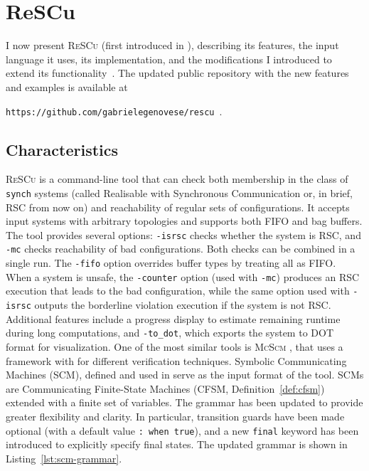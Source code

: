 \chapter{ReSCu}\label{sec:rescu}
I now present \textsc{ReSCu} (first introduced in \cite{desgeorges2023rsc, di2023multiparty, guizouarn2023communicating}),
describing its features, the input
language it uses, its implementation, and the modifications I introduced to
extend its functionality~\cite{rescuoriginalrepo}. The updated
public repository with 
the new features and examples is available at 
\begin{center}
\verb|https://github.com/gabrielegenovese/rescu|~\cite{rescurepo}.
\end{center}

\section{Characteristics}
\textsc{ReSCu} is a command-line tool that can check both membership in the 
class of \verb|synch| systems (called Realisable with Synchronous Communication 
or, in brief, RSC from now on) and reachability of regular sets of configurations. It 
accepts input systems with arbitrary topologies and supports both FIFO and 
bag buffers. The tool provides several options: 
\verb|-isrsc| checks whether the system is RSC, and \verb|-mc| checks reachability of 
bad configurations. Both checks can be combined in a single run. The \verb|-fifo| option 
overrides buffer types by treating all as FIFO. When a system is unsafe, the 
\verb|-counter| option (used with \verb|-mc|) produces an RSC execution that leads 
to the bad configuration, while the same option used with \verb|-isrsc| outputs the 
borderline violation execution if the system is not RSC. Additional features include 
a progress display to estimate remaining runtime during long computations, and 
\verb|-to_dot|, which exports the system to DOT format for visualization.
One of the most similar tools is \textsc{McScm} \cite{heussner2012mcscm}, that
uses a framework with for different verification techniques. 
Symbolic Communicating Machines (SCM), defined and used in \cite[Definition 5.1]{le2008abstract}
serve as the input format of the tool. SCMs are Communicating 
Finite-State Machines (CFSM, Definition~\ref{def:cfsm}) 
extended with a finite set of variables.
The grammar has been updated to provide greater flexibility and clarity. In
particular, transition guards have been made optional (with a default value
\verb|: when true|), and a new \verb|final| keyword has been introduced to
explicitly specify final states. The updated grammar is shown in
Listing~\ref{lst:scm-grammar}. 

